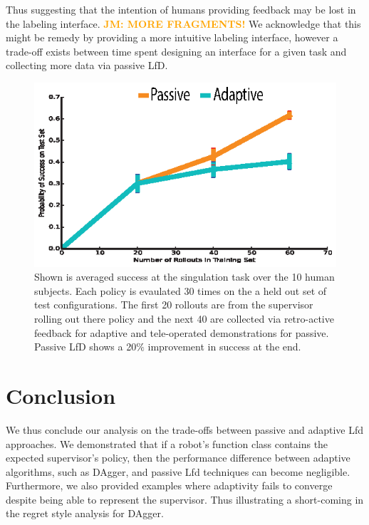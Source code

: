 \documentclass[10pt, conference]{ieeeconf}      %
\newcommand{\jmnote}[1]{%
 {\textcolor{orange}{\textbf{JM: #1}}}{}}
\begin{document}
Thus suggesting that the intention of humans providing feedback may be lost in the labeling interface. \jmnote{MORE FRAGMENTS!} We acknowledge that this might be remedy by providing a more intuitive labeling interface, however a trade-off exists between time spent designing an interface for a given task and collecting more data via passive LfD. 

\begin{figure}
\centering
\includegraphics{f_figs/izzy_reward.eps}
\caption{
    \footnotesize
Shown is averaged success at the singulation task over the 10 human subjects. Each policy is evaulated 30 times on the a held out set of test configurations. The first 20 rollouts are from the supervisor rolling out there policy and the next 40 are collected via retro-active feedback for adaptive and tele-operated demonstrations for passive. Passive LfD shows a 20$\%$ improvement in success at the end. }
\vspace*{-20pt}
\label{fig:izzy_rw}
\end{figure}



\section{Conclusion}
We thus conclude our analysis on the trade-offs between passive and adaptive Lfd approaches. We demonstrated that if a robot's function class contains the expected supervisor's policy, then the  performance difference between adaptive algorithms, such as DAgger,  and passive Lfd techniques can become negligible.  Furthermore, we also provided examples where adaptivity fails to converge despite being able to represent the supervisor. Thus illustrating a short-coming in the regret style analysis for DAgger. 
\end{document}

